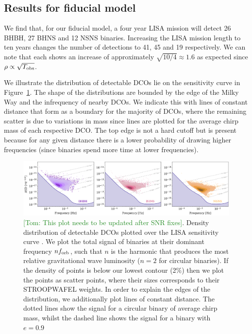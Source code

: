 \documentclass[twocolumn]{aastex63}
\newcommand{\tom}[1]{\textcolor{ForestGreen}{[Tom: #1]}}
\begin{document}
\subsection{Results for fiducial model}\label{sec:fiducial_distributions}
We find that, for our fiducial model, a four year LISA mission will detect 26 BHBH, 27 BHNS and 12 NSNS binaries. Increasing the LISA mission length to ten years changes the number of detections to 41, 45 and 19 respectively. We can note that each shows an increase of approximately $\sqrt{10 / 4} \approx 1.6$ as expected since $\rho \propto \sqrt{T_{\rm obs}}$.

We illustrate the distribution of detectable DCOs lie on the sensitivity curve in Figure~\ref{fig:dcos_on_sc}. The shape of the distributions are bounded by the edge of the Milky Way and the infrequency of nearby DCOs. We indicate this with lines of constant distance that form as a boundary for the majority of DCOs, where the remaining scatter is due to variations in mass since lines are plotted for the average chirp mass of each respective DCO. The top edge is not a hard cutoff but is present because for any given distance there is a lower probability of drawing higher frequencies (since binaries spend more time at lower frequencies).

\begin{figure}[t]
    \centering
    \includegraphics[width=\textwidth]{dcos_on_sc.png}
    \caption{\tom{This plot needs to be updated after SNR fixes}. Density distribution of detectable DCOs plotted over the LISA sensitivity curve \citep{Robson+2019}. We plot the total signal of binaries at their dominant frequency $n f_{\rm orb}$, such that $n$ is the harmonic that produces the most relative gravitational wave luminosity ($n = 2$ for circular binaries). If the density of points is below our lowest contour (2\%) then we plot the points as scatter points, where their sizes corresponds to their STROOPWAFEL weights. In order to explain the edges of the distribution, we additionally plot lines of constant distance. The dotted lines show the signal for a circular binary of average chirp mass, whilst the dashed line shows the signal for a binary with $e = 0.9$}
    \label{fig:dcos_on_sc}
\end{figure}
\end{document}
